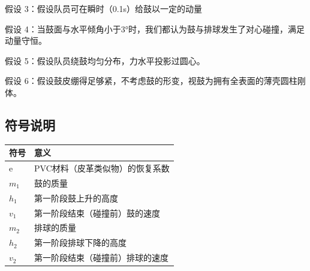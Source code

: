 \documentclass[UTF8]{article}
\begin{document}
假设 3：假设队员可在瞬时（0.1s）给鼓以一定的动量

假设 4：当鼓面与水平倾角小于3°时，我们都认为鼓与排球发生了对心碰撞，满足动量守恒。

假设 5：假设队员绕鼓均匀分布，力水平投影过圆心。

假设 6：假设鼓皮绷得足够紧，不考虑鼓的形变，视鼓为拥有全表面的薄壳圆柱刚体。\\

\begin{center}
    \section{符号说明}   
\end{center}

\begin{center}
    \begin{table}[h]
        \centering
        \begin{tabular}{p{3cm}<{\centering}|p{7cm}<{\centering}} %
            \toprule 
            符号&意义\\
            \hline
            e&PVC材料（皮革类似物）的恢复系数\\
            \hline
            $m_1$&鼓的质量\\
            \hline
            $h_1$&第一阶段鼓上升的高度\\
            \hline
            $v_1$&第一阶段结束（碰撞前）鼓的速度\\
            \hline
            $m_2$&排球的质量\\
            \hline
            $h_2$&第一阶段排球下降的高度\\
            \hline
            $v_2$&第一阶段结束（碰撞前）排球的速度\\
            \bottomrule 
        \end{tabular}  
    \end{table}  
\end{center}
\end{document}
